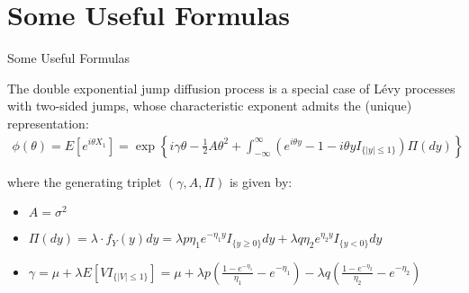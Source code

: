 \documentclass{beamer}
\begin{document}
\section{Some Useful Formulas}
\begin{frame}{Some Useful Formulas}

    {\footnotesize \footnotesize
    \par The double exponential jump diffusion process is a special 
    case of L\'evy processes with two-sided jumps, whose characteristic exponent admits the (unique) representation: 
    \vspace{1em}
    \begin{align*}
    \phi(\theta) = E[e^{i\theta X_1}] = \exp\left\{i\gamma\theta - \frac{1}{2}A\theta^2 
    + \int_{-\infty}^{\infty}(e^{i\theta y} - 1 - i\theta y I_{\{|y|\leq 1\}})\Pi(dy)\right\}
    \end{align*}\vspace{1em}
    \par where the generating triplet $(\gamma, A, \Pi)$ is given by:
    \vspace{1em}
    \begin{itemize}
        \item $A = \sigma^2$
        \item $\Pi(dy) = \lambda \cdot f_Y(y)dy 
        = \lambda p \eta_1 e^{-\eta_1 y} I_{\{y\geq 0\}} dy + \lambda q \eta_2 e^{\eta_2 y} I_{\{y<0\}} dy$
        \item $\gamma = \mu + \lambda E[V I_{\{|V|\leq 1\}}] = \mu + \lambda p \left( \frac{1 - e^{-\eta_1}}{\eta_1} 
        - e^{-\eta_1} \right) - \lambda q \left( \frac{1 - e^{-\eta_2}}{\eta_2} - e^{-\eta_2} \right)$
    \end{itemize}
    
    
    }

    
\end{frame}
\end{document}
